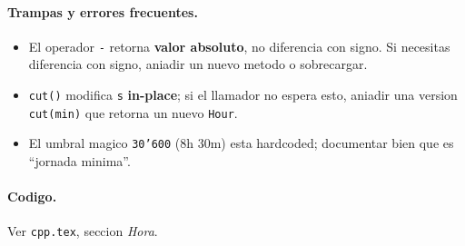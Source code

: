 \paragraph{Trampas y errores frecuentes.}
\begin{itemize}\setlength\itemsep{0pt}
	\item El operador \texttt{-} retorna \textbf{valor absoluto}, no diferencia con signo. Si necesitas diferencia con signo, aniadir un nuevo metodo o sobrecargar.
	\item \texttt{cut()} modifica \texttt{s} \textbf{in-place}; si el llamador no espera esto, aniadir una version \texttt{cut(min)} que retorna un nuevo \texttt{Hour}.
	\item El umbral magico \texttt{30'600} (8h 30m) esta hardcoded; documentar bien que es ``jornada minima''.
\end{itemize}

\paragraph{Codigo.}
Ver \texttt{cpp.tex}, seccion \textit{Hora}.


